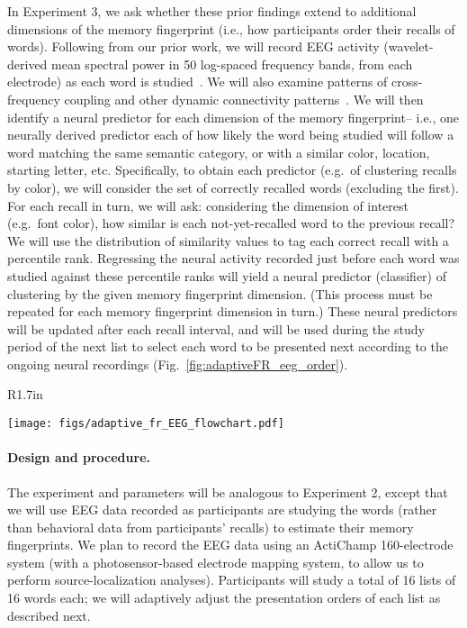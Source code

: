 In Experiment 3, we ask whether these prior findings extend to additional dimensions of the memory fingerprint (i.e., how participants order their recalls of words).  Following from our prior work, we will record EEG activity (wavelet-derived mean spectral power in 50 log-spaced frequency bands, from each electrode) as each word is studied~\citep{MannEtal11, MannEtal12}.  We will also examine patterns of cross-frequency coupling and other dynamic connectivity patterns~\citep{MannEtal14b}.  We will then identify a neural predictor for each dimension of the memory fingerprint-- i.e., one neurally derived predictor each of how likely the word being studied will follow a word matching the same semantic category, or with a similar color, location, starting letter, etc.  Specifically, to obtain each predictor (e.g.\ of clustering recalls by color), we will consider the set of correctly recalled words (excluding the first).  For each recall in turn, we will ask: considering the dimension of interest (e.g.\ font color), how similar is each not-yet-recalled word to the previous recall?  We will use the distribution of similarity values to tag each correct recall with a percentile rank.  Regressing the neural activity recorded just before each word was studied against these percentile ranks will yield a neural predictor (classifier) of clustering by the given memory fingerprint dimension.  (This process must be repeated for each memory fingerprint dimension in turn.)  These neural predictors will be updated after each recall interval, and will be used during the study period of the next list to select each word to be presented next according to the ongoing neural recordings (Fig.~\ref{fig:adaptiveFR_eeg_order}).

\begin{wrapfigure}[11]{R}{1.7in}
\vspace{-46pt}
  \begin{center}
    \texttt{[image: figs/adaptive\_fr\_EEG\_flowchart.pdf]}
  \end{center}
\vspace{-23pt}
  \caption{\footnotesize \textbf{AdaptiveFR with EEG.}  EEG recordings during study are used to update the memory fingerprint classifier after each batch of recalls.  The classifier is used to adapt the presentation order on a word-by-word basis when the next list is studied.}
  \label{fig:adaptiveFR_eeg_order}
\end{wrapfigure}

\paragraph{Design and procedure.} The experiment and parameters will be analogous to Experiment 2, except that we will use EEG data recorded as participants are studying the words (rather than behavioral data from participants' recalls) to estimate their memory fingerprints.  We plan to record the EEG data using an ActiChamp 160-electrode system (with a photosensor-based electrode mapping system, to allow us to perform source-localization analyses).  Participants will study a total of 16 lists of 16 words each; we will adaptively adjust the presentation orders of each list as described next.

